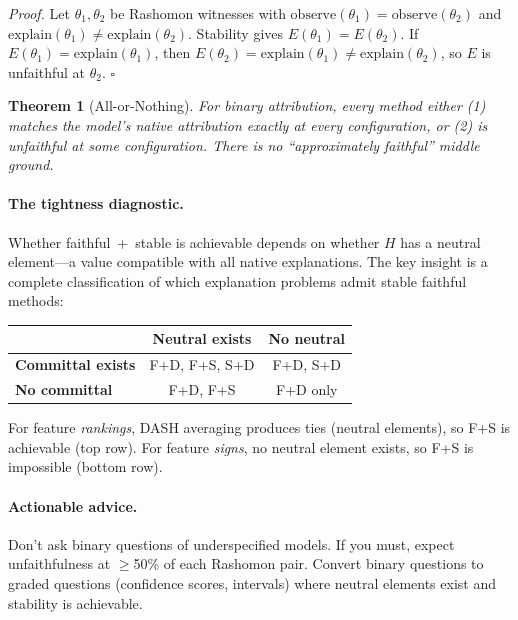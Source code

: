 \documentclass{article}
\newtheorem{theorem}{Theorem}
\begin{document}
\noindent\textit{Proof.}
Let $\theta_1, \theta_2$ be Rashomon witnesses with $\text{observe}(\theta_1) = \text{observe}(\theta_2)$ and $\text{explain}(\theta_1) \neq \text{explain}(\theta_2)$.
Stability gives $E(\theta_1) = E(\theta_2)$.
If $E(\theta_1) = \text{explain}(\theta_1)$, then $E(\theta_2) = \text{explain}(\theta_1) \neq \text{explain}(\theta_2)$, so $E$ is unfaithful at $\theta_2$. \hfill$\square$

\begin{theorem}[All-or-Nothing]\label{thm:all-or-nothing}
For binary attribution, every method either (1) matches the model's native attribution exactly at every configuration, or (2) is unfaithful at some configuration.
There is no ``approximately faithful'' middle ground.
\end{theorem}

\paragraph{The tightness diagnostic.}
Whether faithful~+~stable is achievable depends on whether $H$ has a neutral element---a value compatible with all native explanations.
The key insight is a complete classification of which explanation problems admit stable faithful methods:

\begin{center}
\begin{tabular}{l|cc}
 & Neutral exists & No neutral \\
\hline
\textbf{Committal exists} & F+D, F+S, S+D & F+D, S+D \\
\textbf{No committal}     & F+D, F+S       & F+D only \\
\end{tabular}
\end{center}

\noindent For feature \emph{rankings}, DASH averaging produces ties (neutral elements), so F+S is achievable (top row).
For feature \emph{signs}, no neutral element exists, so F+S is impossible (bottom row).

\paragraph{Actionable advice.}
Don't ask binary questions of underspecified models.
If you must, expect unfaithfulness at $\geq$50\% of each Rashomon pair.
Convert binary questions to graded questions (confidence scores, intervals) where neutral elements exist and stability is achievable.
\end{document}
